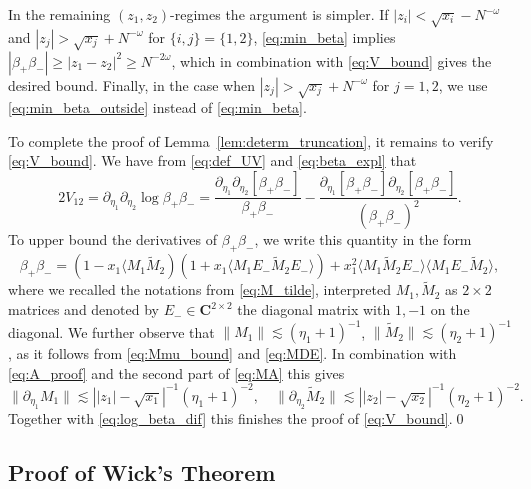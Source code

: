 \documentclass[10pt]{amsart}
\numberwithin{equation}{section}
\newcommand{\C}{\mathbf{C}}
\begin{document}
In the remaining $(z_1,z_2)$-regimes the argument is simpler. If $|z_i|<\sqrt{x_i}-N^{-\omega}$ and $|z_j|>\sqrt{x_j}+N^{-\omega}$ for $\{i,j\}=\{1,2\}$, \eqref{eq:min_beta} implies $|\beta_+\beta_-|\ge |z_1-z_2|^2\ge N^{-2\omega}$, which in combination with \eqref{eq:V_bound} gives the desired bound. Finally, in the case when $|z_j|>\sqrt{x_j}+N^{-\omega}$ for $j=1,2$, we use \eqref{eq:min_beta_outside} instead of \eqref{eq:min_beta}.

To complete the proof of Lemma~\ref{lem:determ_truncation}, it remains to verify \eqref{eq:V_bound}. We have from \eqref{eq:def_UV} and \eqref{eq:beta_expl} that
\begin{equation}
2V_{12} =\partial_{\eta_1}\partial_{\eta_2} \log \beta_+\beta_- = \frac{\partial_{\eta_1}\partial_{\eta_2} \left[\beta_+\beta_-\right]}{\beta_+\beta_-} - \frac{\partial_{\eta_1}\left[\beta_+\beta_-\right]\partial_{\eta_2}\left[\beta_+\beta_-\right]}{\left(\beta_+\beta_-\right)^2}.
\label{eq:log_beta_dif}
\end{equation}
To upper bound the derivatives of $\beta_+\beta_-$, we write this quantity in the form
\begin{equation}
\beta_+\beta_- = \left(1-x_1\langle M_1\widetilde{M}_2\right)\left(1+x_1\langle M_1E_-\widetilde{M}_2E_-\rangle\right) + x_1^2 \langle M_1\widetilde{M}_2E_-\rangle \langle M_1E_-\widetilde{M}_2\rangle,
\end{equation}
where we recalled the notations from \eqref{eq:M_tilde}, interpreted $M_1,\widetilde{M}_2$ as $2\times 2$ matrices and denoted by $E_-\in \C^{2\times 2}$ the diagonal matrix with $1,-1$ on the diagonal. We further observe that $\|M_1\|\lesssim (\eta_1+1)^{-1}$, $\|\widetilde{M}_2\|\lesssim (\eta_2+1)^{-1}$, as it follows from \eqref{eq:Mmu_bound} and \eqref{eq:MDE}. In combination with \eqref{eq:A_proof} and the second part of \eqref{eq:MA} this gives
\begin{equation}
\|\partial_{\eta_1}M_1\|\lesssim \left\vert |z_1|-\sqrt{x_1}\right\vert^{-1}\left(\eta_1+1\right)^{-2},\quad \|\partial_{\eta_2}\widetilde{M}_2\|\lesssim \left\vert |z_2|-\sqrt{x_2}\right\vert^{-1}\left(\eta_2+1\right)^{-2}.
\end{equation}
Together with \eqref{eq:log_beta_dif} this finishes the proof of \eqref{eq:V_bound}.\hfill\qed

\subsection{Proof of Wick's Theorem}\label{sec:Wick}
\end{document}
